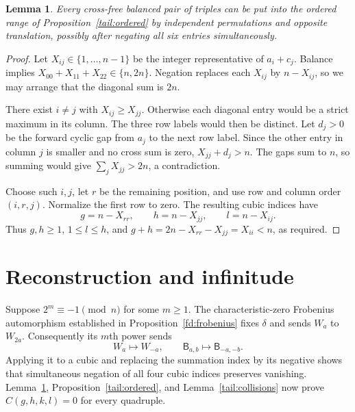 \documentclass[11pt]{article}
\numberwithin{equation}{section}
\newtheorem{lemma}[theorem]{Lemma}
\theoremstyle{definition}
\theoremstyle{remark}
\begin{document}
\begin{lemma}\label{tail:normalform}
Every cross-free balanced pair of triples can be put into
the ordered range of Proposition~\ref{tail:ordered} by
independent permutations and opposite translation, possibly
after negating all six entries simultaneously.
\end{lemma}

\begin{proof}
Let $X_{ij}\in\{1,\ldots,n-1\}$ be the integer representative
of $a_i+c_j$.  Balance implies
$X_{00}+X_{11}+X_{22}\in\{n,2n\}$.  Negation replaces each
$X_{ij}$ by $n-X_{ij}$, so we may arrange that the diagonal
sum is $2n$.

There exist $i\ne j$ with $X_{ij}\ge X_{jj}$.  Otherwise
each diagonal entry would be a strict maximum in its column.
The three row labels would then be distinct.  Let $d_j>0$
be the forward cyclic gap from $a_j$ to the next row label.
Since the other entry in column $j$ is smaller and no cross
sum is zero, $X_{jj}+d_j>n$.  The gaps sum to $n$, so summing
would give $\sum_jX_{jj}>2n$, a contradiction.

Choose such $i,j$, let $r$ be the remaining position, and use
row and column order $(i,r,j)$.  Normalize the first row to
zero.  The resulting cubic indices have
\[
 g=n-X_{rr},\qquad h=n-X_{jj},\qquad l=n-X_{ij}.
\]
Thus $g,h\ge1$, $1\le l\le h$, and
$g+h=2n-X_{rr}-X_{jj}=X_{ii}<n$, as required.
\end{proof}

\section{Reconstruction and infinitude}
\label{tail:reconstruction}

Suppose $2^m\equiv-1\pmod n$ for some $m\ge1$.
The characteristic-zero Frobenius automorphism established in
Proposition~\ref{fd:frobenius} fixes $\delta$ and sends $W_a$ to $W_{2a}$.
Consequently its $m$th power sends
\[
 W_a\longmapsto W_{-a},\qquad
 \mathsf B_{a,b}\longmapsto\mathsf B_{-a,-b}.
\]
Applying it to a cubic and replacing the summation index by
its negative shows that simultaneous negation of all four
cubic indices preserves vanishing.  Lemma~\ref{tail:normalform},
Proposition~\ref{tail:ordered}, and Lemma~\ref{tail:collisions}
now prove $C(g,h,k,l)=0$ for every quadruple.
\end{document}
